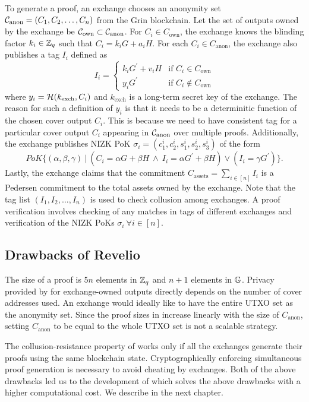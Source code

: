 To generate a \R proof, an exchange chooses an anonymity set $\mathcal{C}_{\text{anon}} = (C_1, C_2, \dots, C_n)$ from the Grin blockchain.
Let the set of outputs owned by the exchange be $\mathcal{C}_{\text{own}} \subset \mathcal{C}_{\text{anon}}$. 
For $C_i \in C_{\text{own}}$, the exchange knows the blinding factor $k_i \in\mathbb{Z}_q$ such that $C_i = k_iG + a_iH$.
For each $C_i \in C_{\text{anon}}$, the exchange also publishes a tag $I_i$ defined as
\begin{equation}
    I_i = 
    \begin{cases}
        k_iG^{\prime} + v_iH & \text{if } C_i \in C_{\text{own}}\\
        y_iG^{\prime} & \text{if } C_i \notin C_{\text{own}}
    \end{cases}
\end{equation}
where $y_i = \mathcal{H}(k_{\text{exch}}, C_i)$ and $k_{\text{exch}}$ is a long-term secret key of the exchange.
The reason for such a definition of $y_i$ is that it needs to be a determinitic function of the chosen cover output $C_i$.
This is because we need to have consistent tag for a particular cover output $C_i$ appearing in $\mathcal{C}_{\text{anon}}$ over multiple \R proofs.
Additionally, the exchange publishes NIZK PoK $\sigma_i = (c_1^i,c_2^i, s_1^i, s_2^i, s_3^i)$ of the form 
\begin{equation*}
    PoK\{(\alpha, \beta, \gamma) \ | \ (C_i = \alpha G + \beta H \ \wedge \ I_i = \alpha G^{\prime} + \beta H) \vee (I_i = \gamma G^{\prime}) \}.
\end{equation*}
Lastly, the exchange claims that the commitment $C_{\text{assets}} = \sum_{i \in [n]} I_i$
is a Pedersen commitment to the total assets owned by the exchange.
Note that the tag list $(I_1, I_2, \dots, I_n)$ is used to check collusion among exchanges.
A \R proof verification involves checking of any matches in tags of different exchanges and verification of the NIZK PoKs $\sigma_i \ \forall i \in [n]$.

\subsection{Drawbacks of \textnormal{{\selectfont Revelio}}}

The size of a \R proof is $5n$ elements in $\mathbb{Z}_q$ and $n+1$ elements in $\mathbb{G}$.
Privacy provided by \R for exchange-owned outputs directly depends on the number of cover addresses used.
An exchange would ideally like to have the entire UTXO set as the anonymity set. 
Since the proof sizes in \R increase linearly
with the size of $C_{\text{anon}}$, setting $C_{\text{anon}}$ to be equal
to the whole UTXO set is not a scalable strategy.

The collusion-resistance property of \R works only
if all the exchanges generate their proofs using the same
blockchain state.
Cryptographically enforcing simultaneous proof generation is necessary to avoid cheating by exchanges.
Both of the above drawbacks led us to the development of \RB which solves the above drawbacks with a higher computational cost.
We describe \RB in the next chapter. 